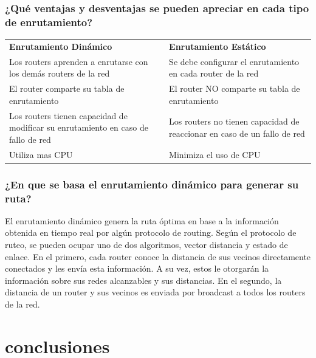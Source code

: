 \documentclass[spanish]{udpreport}
\begin{document}
\subsection{¿Qué ventajas y desventajas se pueden apreciar en cada tipo de enrutamiento?}
\begin{table}[H]
\centering
\begin{tabular}{p{8cm}|p{8cm}}
\textbf{Enrutamiento Dinámico} & \textbf{Enrutamiento Estático} \\
     Los routers aprenden a enrutarse con los demás routers de la red &
     Se debe configurar el enrutamiento en cada router de la red \\
     El router comparte su tabla de enrutamiento  &
     El router NO comparte su tabla de enrutamiento  \\
     Los routers tienen capacidad de modificar su enrutamiento en caso de fallo de red &
     Los routers no tienen capacidad de reaccionar en caso de un fallo de red \\
     Utiliza mas CPU &
     Minimiza el uso de CPU \\
\end{tabular}
\end{table}

\subsection{¿En que se basa el enrutamiento dinámico para generar su ruta?}
El enrutamiento dinámico genera la ruta óptima en base a la información obtenida en tiempo real por algún protocolo de routing. Según el protocolo de ruteo, se pueden ocupar uno de dos algoritmos, vector distancia y estado de enlace. En el primero, cada router conoce la distancia de sus vecinos directamente conectados y les envía esta información. A su vez, estos le otorgarán la información sobre sus redes alcanzables y sus distancias. En el segundo, la distancia de un router y sus vecinos es enviada por broadcast a todos los routers de la red.

\chapter{conclusiones}
\end{document}
